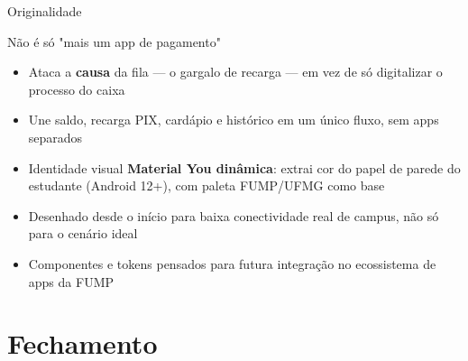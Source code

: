 \documentclass[10pt, aspectratio=169]{beamer}
\begin{document}
\begin{frame}{Originalidade}
    \begin{block}{Não é só "mais um app de pagamento"}
        \small
        \begin{itemize}
            \item Ataca a \textbf{causa} da fila --- o gargalo de recarga --- em vez de só digitalizar o processo do caixa
            \item Une saldo, recarga PIX, cardápio e histórico em um único fluxo, sem apps separados
            \item Identidade visual \textbf{Material You dinâmica}: extrai cor do papel de parede do estudante (Android 12+), com paleta FUMP/UFMG como base
            \item Desenhado desde o início para baixa conectividade real de campus, não só para o cenário ideal
            \item Componentes e tokens pensados para futura integração no ecossistema de apps da FUMP
        \end{itemize}
    \end{block}
\end{frame}

\section{Fechamento}
\end{document}
